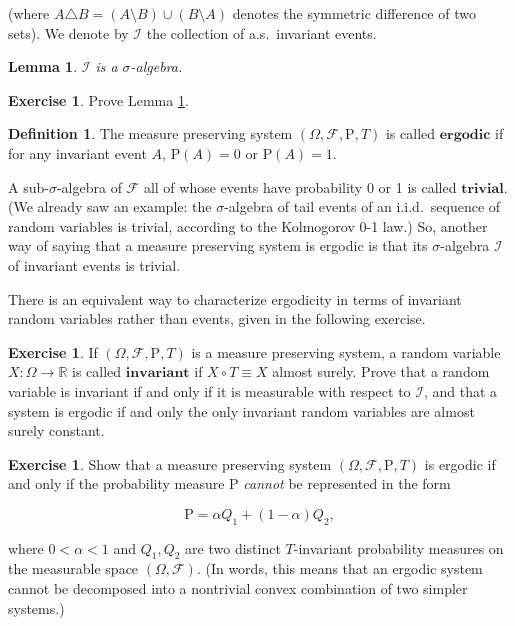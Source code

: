\documentclass[11pt]{report}
\newcommand{\R}{\mathbb{R}}
\theoremstyle{plain}
\newtheorem{lem}[thm]{Lemma}
\theoremstyle{definition}
\newtheorem{defn}[thm]{Definition}
\newtheorem{xexercise}[thm]{Exercise}
\begin{document}
(where $A\triangle B = (A\setminus B)\cup (B\setminus A)$ denotes the symmetric difference of two sets). We denote by $\mathcal{I}$ the collection of a.s.\ invariant events.

\begin{lem}
\label{lem-invariant-sigmaalg}
$\mathcal{I}$ is a $\sigma$-algebra.
\end{lem}

\begin{xexercise}
Prove Lemma \ref{lem-invariant-sigmaalg}.
\end{xexercise}

\begin{defn}
The measure preserving system $(\Omega, \mathcal{F}, \mathrm{P}, T)$ is called $\textbf{ergodic}$ if for any invariant event $A$, $\mathrm{P}(A)=0$ or $\mathrm{P}(A)=1$.
\end{defn}

A sub-$\sigma$-algebra of $\mathcal{F}$ all of whose events have probability 0 or 1 is called $\textbf{trivial}$. (We already saw an example: the $\sigma$-algebra of tail events of an i.i.d.\ sequence of random variables is trivial, according to the Kolmogorov 0-1 law.) So, another way of saying that a measure preserving system is ergodic is that its $\sigma$-algebra $\mathcal{I}$ of invariant events is trivial.

There is an equivalent way to characterize ergodicity in terms of invariant random variables rather than events, given in the following exercise.

\begin{xexercise}
If $(\Omega, \mathcal{F}, \mathrm{P}, T)$ is a measure preserving system, a random variable $X:\Omega\to\R$ is called $\textbf{invariant}$ if $X\circ T \equiv X$ almost surely. Prove that a random variable is invariant if and only if it is measurable with respect to $\mathcal{I}$, and that a system is ergodic if and only the only invariant random variables are almost surely constant.
\end{xexercise}

\begin{xexercise}
Show that a measure preserving system $(\Omega, \mathcal{F}, \mathrm{P}, T)$ is ergodic if and only if the probability measure $\mathrm{P}$ \emph{cannot} be represented in the form

\[
\mathrm{P} = \alpha Q_1 + (1-\alpha)Q_2,
\]

where $0<\alpha<1$ and $Q_1, Q_2$ are two distinct $T$-invariant probability measures on the measurable space $(\Omega, \mathcal{F})$. (In words, this means that an ergodic system cannot be decomposed into a nontrivial convex combination of two simpler systems.)
\end{xexercise}
\end{document}
